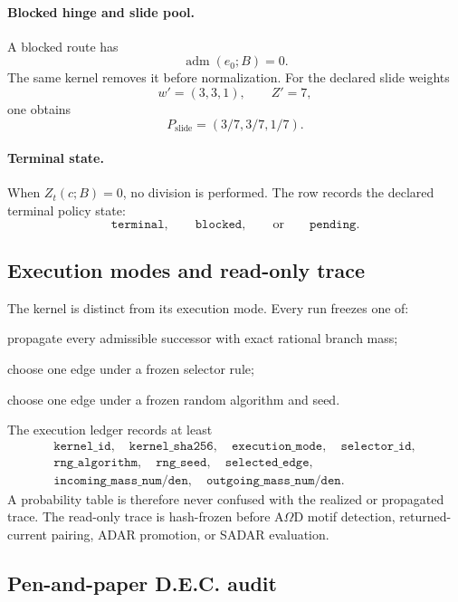 \paragraph{Blocked hinge and slide pool.}
A blocked route has
\[
\operatorname{adm}(e_0;B)=0.
\]
The same kernel removes it before normalization.  For the declared slide weights
\[
w'=(3,3,1),
\qquad
Z'=7,
\]
one obtains
\[
P_{\mathrm{slide}}=(3/7,3/7,1/7).
\]

\paragraph{Terminal state.}
When $Z_t(c;B)=0$, no division is performed.  The row records the declared terminal policy state:
\[
\texttt{terminal},
\qquad
\texttt{blocked},
\qquad\text{or}\qquad
\texttt{pending}.
\]

\subsection{Execution modes and read-only trace}

The kernel is distinct from its execution mode.  Every run freezes one of:
\begin{description}[leftmargin=2.1em,style=nextline]
  \item[\texttt{enumerate\_all}] propagate every admissible successor with exact rational branch mass;
  \item[\texttt{deterministic\_selector}] choose one edge under a frozen selector rule;
  \item[\texttt{sample\_one}] choose one edge under a frozen random algorithm and seed.
\end{description}

The execution ledger records at least
\[
\begin{gathered}
\texttt{kernel\_id},\quad
\texttt{kernel\_sha256},\quad
\texttt{execution\_mode},\quad
\texttt{selector\_id},\\
\texttt{rng\_algorithm},\quad
\texttt{rng\_seed},\quad
\texttt{selected\_edge},\\
\texttt{incoming\_mass\_num/den},\quad
\texttt{outgoing\_mass\_num/den}.
\end{gathered}
\]
A probability table is therefore never confused with the realized or propagated trace.  The read-only trace is hash-frozen before A$\Omega$D motif detection, returned-current pairing, ADAR promotion, or SADAR evaluation.

\subsection{Pen-and-paper D.E.C. audit}

